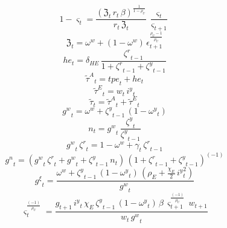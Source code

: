 \begin{dmath}
1-{{\varsigma}}_{t}=\frac{\left({{\mathfrak{Z}}}_{t}\, {{r}}_{t}\, {{\beta}}\right)^{\frac{1}{1-{{\rho_U}}}}}{{{r}}_{t}\, {{\mathfrak{Z}}}_{t}}\, \frac{{{\varsigma}}_{t}}{{{\varsigma}}_{t+1}}
\end{dmath}
\begin{dmath}
{{\mathfrak{Z}}}_{t}={{\omega^w}}+\left(1-{{\omega^w}}\right)\, {{\epsilon}}_{t+1}^{\frac{{{\rho_U}}-1}{{{\rho_U}}}}
\end{dmath}
\begin{dmath}
{{he}}_{t}={{\delta_{HE}}}\, \frac{{{\zeta^{r}}}_{t-1}}{1+{{\zeta^{r}}}_{t-1}+{{\zeta^{y}}}_{t-1}}
\end{dmath}
\begin{dmath}
{\tilde{\tau}^A}_{t}={{tpe}}_{t}+{{he}}_{t}
\end{dmath}
\begin{dmath}
{\tilde{\tau}^E}_{t}={{w}}_{t}\, {{i^y}}_{t}
\end{dmath}
\begin{dmath}
{\tilde{\tau}}_{t}={\tilde{\tau}^A}_{t}+{\tilde{\tau}^E}_{t}
\end{dmath}
\begin{dmath}
{{g^w}}_{t}={{\omega^w}}+{{\zeta^{y}}}_{t-1}\, \left(1-{{\omega^{y}}}_{t}\right)
\end{dmath}
\begin{dmath}
{{n}}_{t}={{g^w}}_{t}\, \frac{{{\zeta^{y}}}_{t}}{{{\zeta^{y}}}_{t-1}}
\end{dmath}
\begin{dmath}
{{g^w}}_{t}\, {{\zeta^{r}}}_{t}=1-{{\omega^w}}+{{\gamma}}_{t}\, {{\zeta^{r}}}_{t-1}
\end{dmath}
\begin{dmath}
{{g^n}}_{t}=\left({{g^w}}_{t}\, {{\zeta^{r}}}_{t}+{{g^w}}_{t}+{{\zeta^{y}}}_{t-1}\, {{n}}_{t}\right)\, \left(1+{{\zeta^{r}}}_{t-1}+{{\zeta^{y}}}_{t-1}\right)^{\left(-1\right)}
\end{dmath}
\begin{dmath}
{{g^{\xi}}}_{t}=\frac{{{\omega^w}}+{{\zeta^{y}}}_{t-1}\, \left(1-{{\omega^{y}}}_{t}\right)\, \left({{\rho_E}}+\frac{{{\chi_E}}}{2}\, {{i^y}}_{t}^{2}\right)}{{{g^w}}_{t}}
\end{dmath}
\begin{dmath}
{{\varsigma}}_{t}^{\frac{\left(-1\right)}{{{\rho_U}}}}=\frac{{{g}}_{t+1}\, {{i^y}}_{t}\, {{\chi_E}}\, {{\zeta^{y}}}_{t-1}\, \left(1-{{\omega^{y}}}_{t}\right)\, {{\beta}}\, {{\varsigma}}_{t+1}^{\frac{\left(-1\right)}{{{\rho_U}}}}\, {{w}}_{t+1}}{{{w}}_{t}\, {{g^w}}_{t}}
\end{dmath}
